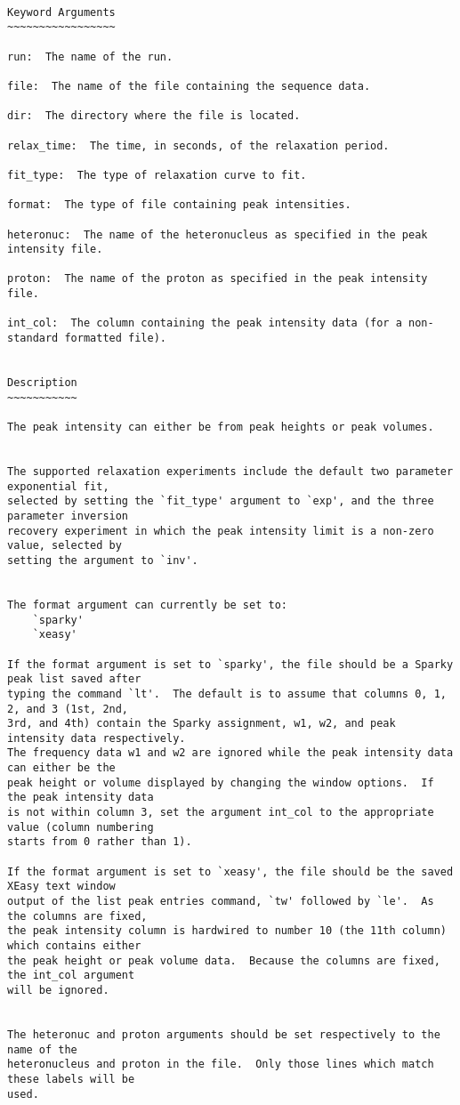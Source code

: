 {\scriptsize
\begin{verbatim}

Keyword Arguments
~~~~~~~~~~~~~~~~~

run:  The name of the run.

file:  The name of the file containing the sequence data.

dir:  The directory where the file is located.

relax_time:  The time, in seconds, of the relaxation period.

fit_type:  The type of relaxation curve to fit.

format:  The type of file containing peak intensities.

heteronuc:  The name of the heteronucleus as specified in the peak intensity file.

proton:  The name of the proton as specified in the peak intensity file.

int_col:  The column containing the peak intensity data (for a non-standard formatted file).


Description
~~~~~~~~~~~

The peak intensity can either be from peak heights or peak volumes.


The supported relaxation experiments include the default two parameter exponential fit,
selected by setting the `fit_type' argument to `exp', and the three parameter inversion
recovery experiment in which the peak intensity limit is a non-zero value, selected by
setting the argument to `inv'.


The format argument can currently be set to:
    `sparky'
    `xeasy'

If the format argument is set to `sparky', the file should be a Sparky peak list saved after
typing the command `lt'.  The default is to assume that columns 0, 1, 2, and 3 (1st, 2nd,
3rd, and 4th) contain the Sparky assignment, w1, w2, and peak intensity data respectively.
The frequency data w1 and w2 are ignored while the peak intensity data can either be the
peak height or volume displayed by changing the window options.  If the peak intensity data
is not within column 3, set the argument int_col to the appropriate value (column numbering
starts from 0 rather than 1).

If the format argument is set to `xeasy', the file should be the saved XEasy text window
output of the list peak entries command, `tw' followed by `le'.  As the columns are fixed,
the peak intensity column is hardwired to number 10 (the 11th column) which contains either
the peak height or peak volume data.  Because the columns are fixed, the int_col argument
will be ignored.


The heteronuc and proton arguments should be set respectively to the name of the
heteronucleus and proton in the file.  Only those lines which match these labels will be
used.
\end{verbatim}
}



